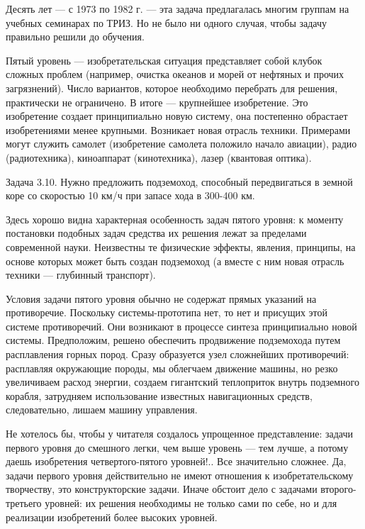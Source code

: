 Десять  лет —  с 1973  по  1982 г.  — эта  задача предлагалась  многим
группам на  учебных семинарах по  ТРИЗ. Но  не было ни  одного случая,
чтобы задачу правильно решили до обучения.

Пятый уровень  — изобретательская  ситуация представляет  собой клубок
сложных  проблем (например,  очистка  океанов и  морей  от нефтяных  и
прочих  загрязнений). Число  вариантов,  которое необходимо  перебрать
для  решения,   практически  не  ограничено.  В   итоге  —  крупнейшее
изобретение.  Это  изобретение  создает принципиально  новую  систему,
она  постепенно  обрастает  изобретениями  менее  крупными.  Возникает
новая отрасль  техники. Примерами  могут служить  самолет (изобретение
самолета положило  начало авиации), радио  (радиотехника), киноаппарат
(кинотехника), лазер (квантовая оптика).

Задача 3.10.  Нужно предложить  подземоход, способный  передвигаться в
земной коре со скоростью 10 км/ч при запасе хода в 300-400 км.

Здесь  хорошо  видна  характерная  особенность  задач  пятого  уровня:
к  моменту  постановки  подобных   задач  средства  их  решения  лежат
за  пределами современной  науки.  Неизвестны  те физические  эффекты,
явления, принципы, на  основе которых может быть  создан подземоход (а
вместе с ним новая отрасль техники — глубинный транспорт).

Условия задачи  пятого уровня  обычно не  содержат прямых  указаний на
противоречие. Поскольку системы-прототипа нет,  то нет и присущих этой
системе противоречий.  Они возникают в процессе  синтеза принципиально
новой системы. Предположим,  решено обеспечить продвижение подземохода
путем  расплавления горных  пород.  Сразу  образуется узел  сложнейших
противоречий:  расплавляя  окружающие  породы, мы  облегчаем  движение
машины,  но  резко  увеличиваем  расход  энергии,  создаем  гигантский
теплоприток  внутрь   подземного  корабля,   затрудняем  использование
известных   навигационных   средств,  следовательно,   лишаем   машину
управления.


Не хотелось  бы, чтобы у читателя  создалось упрощенное представление:
задачи  первого уровня  до  смешного  легки, чем  выше  уровень —  тем
лучше,  а потому  даешь изобретения  четвертого-пятого уровней!..  Все
значительно сложнее. Да, задачи  первого уровня действительно не имеют
отношения к изобретательскому  творчеству, это конструкторские задачи.
Иначе  обстоит дело  с задачами  второго-третьего уровней:  их решения
необходимы не  только сами  по себе, но  и для  реализации изобретений
более высоких уровней.


